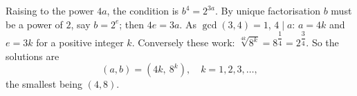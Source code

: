Raising to the power $4a$, the condition is $b^4=2^{3a}$. By unique factorisation $b$ must be a power of $2$, say $b=2^e$; then $4e=3a$. As $\gcd(3,4)=1$, $4\mid a$: $a=4k$ and $e=3k$ for a positive integer $k$. Conversely these work: $\sqrt[4k]{8^k}=8^{\dfrac14}=2^{\dfrac34}$. So the solutions are
\[\boxed{(a,b)=\left(4k,\ 8^k\right),\quad k=1,2,3,\ldots},\]
the smallest being $(4,8)$.

